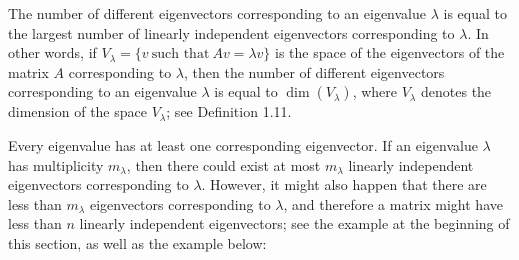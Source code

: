 \begin{definition}
The number of different eigenvectors corresponding to an eigenvalue $\lambda$ is equal
to the largest number of linearly independent eigenvectors corresponding to $\lambda$.
In other words, if $V_\lambda = \{v \ \text{such that} \ Av = \lambda v\}$ is the space
of the eigenvectors of the matrix $A$ corresponding to $\lambda$, then the number of
different eigenvectors corresponding to an eigenvalue $\lambda$ is equal to
$\dim(V_\lambda)$, where $V_\lambda$ denotes the dimension of the space $V_\lambda$; see
Definition 1.11.
\end{definition}

Every eigenvalue has at least one corresponding eigenvector. If an eigenvalue $\lambda$
has multiplicity $m_\lambda$, then there could exist at most $m_\lambda$ linearly
independent eigenvectors corresponding to $\lambda$. However, it might also happen that
there are less than $m_\lambda$ eigenvectors corresponding to $\lambda$, and therefore a
matrix might have less than $n$ linearly independent eigenvectors; see the example at
the beginning of this section, as well as the example below:
